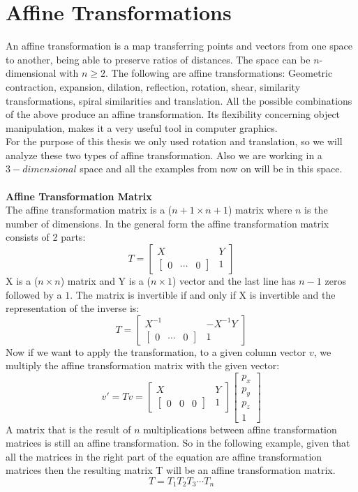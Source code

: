 \section{Affine Transformations}
An affine transformation is a map transferring points and vectors from one space to another, being able to preserve ratios of distances. The space can be \(n\)-dimensional with \(n\ge2\). The following are affine transformations: Geometric contraction, expansion, dilation, reflection, rotation, shear, similarity transformations, spiral similarities and translation. All the possible combinations of the above produce an affine transformation. Its flexibility concerning object manipulation, makes it a very useful tool in computer graphics.\\
For the purpose of this thesis we only used rotation and translation, so we will analyze these two types of affine transformation. Also we are working in a \(3-dimensional\) space and all the examples from now on will be in this space.\\ \\

\textbf{Affine Transformation Matrix}\\
The affine transformation matrix is a (\(n+1\times n+1\)) matrix where \(n\) is the number of dimensions. In the general form the affine transformation matrix consists of 2 parts:
\[
T = 
\begin{bmatrix}
X & Y \\
\begin{bmatrix}
0 & \cdots & 0
\end{bmatrix} & 1
\end{bmatrix}
\]
X is a (\(n\times n\)) matrix and Y is a (\(n\times 1\)) vector and the last line has \(n-1\) zeros followed by a \(1\). The matrix is invertible if and only if X is invertible and the representation of the inverse is:
\[
T = 
\begin{bmatrix}
X^{-1} & -X^{-1}Y \\
\begin{bmatrix}
0 & \cdots & 0
\end{bmatrix} & 1
\end{bmatrix}
\]
Now if we want to apply the transformation, to a given column vector \(v\), we multiply the affine transformation matrix with the given vector:
\[
v' = Tv = 
\begin{bmatrix}
X & Y \\
\begin{bmatrix}
0 & 0 & 0
\end{bmatrix} & 1
\end{bmatrix}
\begin{bmatrix}
p_x\\
p_y\\
p_z\\
1
\end{bmatrix}
\]
A matrix that is the result of \(n\) multiplications between affine transformation matrices is still an affine transformation. So in the following example, given that all the matrices in the right part of the equation are affine transformation matrices then the resulting matrix T will be an affine transformation matrix.
\[
T = T_1T_2T_3 \cdots T_n
\]

